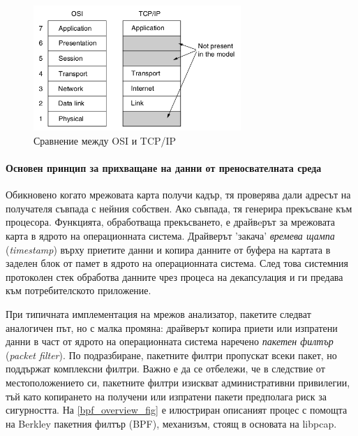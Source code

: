 \documentclass[12pt,a4paper,oneside]{book}
\begin{document}
\begin{figure}[h!]
  \centering
  \includegraphics[width=0.7\textwidth]{figures/osi_vs_tcp.png}
  \caption{Сравнение между OSI и TCP/IP}
  \label{osi_vs_tcp_Fig}
\end{figure}

\paragraph{Основен принцип за прихващане на данни от преносвателната среда}

Обикновено когато мрежовата карта получи кадър, тя проверява дали адресът на
получателя съвпада с нейния собствен. Ако съвпада, тя генерира прекъсване към
процесора. Функцията, обработваща прекъсването, е драйвeрът за мрежовата
карта в ядрото на операционната система. Драйверът 'закача' \textit{времева
щампа}
(\textit{timestamp}) върху приетите данни и копира данните от буфера на картата
в заделен блок от памет в ядрото на операционната система. След това системния
протоколен стек обработва данните чрез процеса на декапсулация и ги предава към
потребителското приложение.

При типичната имплементация на мрежов анализатор, пакетите следват аналогичен
път, но с малка промяна: драйверът копира приети или изпратени данни в част от
ядрото на операционната система наречено \textit{пакетен филтър}
(\textit{packet filter}). По подразбиране,
пакетните филтри пропускат всеки пакет, но поддържат комплексни филтри.
Важно е да се отбележи, че в следствие от местоположението си, пакетните филтри
изискват административни привилегии, тъй като копирането на получени или изпратени
пакети предполага риск за сигурността. На \autoref{bpf_overview_fig} е
илюстриран описаният процес с помощта на Berkley пакетния филтър (BPF),
механизъм, стоящ в основата на libpcap.
\end{document}
